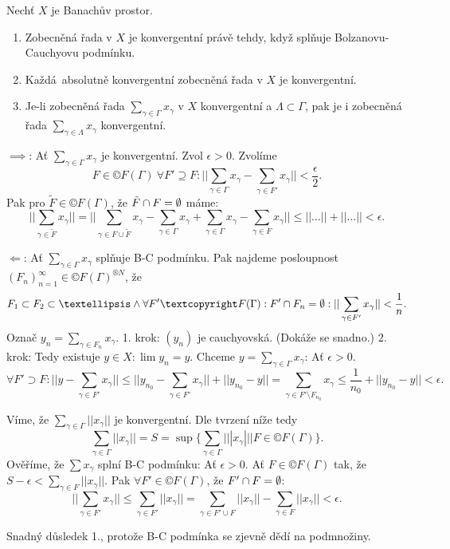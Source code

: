\documentclass[12pt]{article}					%
\begin{document}
\begin{veta}
	Nechť $X$ je Banachův prostor.
	
	\begin{enumerate}
		\item Zobecněná řada v $X$ je konvergentní právě tehdy, když splňuje Bolzanovu-Cauchyovu podmínku.
		\item Každá absolutně konvergentní zobecněná řada v $X$ je konvergentní.
		\item Je-li zobecněná řada $\sum_{\gamma \in \Gamma} x_\gamma$ v $X$ konvergentní a $\Lambda \subset \Gamma$, pak je i zobecněná řada $\sum_{\gamma \in \Lambda} x_\gamma$ konvergentní.
	\end{enumerate}

	\begin{dukazin}[1.]
		$\implies$: Ať $\sum_{\gamma \in \Gamma} x_\gamma$ je konvergentní. Zvol $\epsilon > 0$. Zvolíme 
		$$ F \in ©F(\Gamma)\ \forall F' \supseteq F: ||\sum_{\gamma \in \Gamma}x_\gamma - \sum_{\gamma \in F'}x_\gamma|| < \frac{\epsilon}{2}. $$
		Pak pro $\tilde{F} \in ©F(\Gamma)$, že $\tilde{F} \cap F = \emptyset$ máme:
		$$ ||\sum_{\gamma \in \tilde{F}} x_\gamma|| = ||\sum_{\gamma \in F \cup \tilde{F}} x_\gamma - \sum_{\gamma \in \Gamma} x_\gamma + \sum_{\gamma \in \Gamma} x_\gamma - \sum_{\gamma \in F} x_\gamma|| ≤ ||…|| + ||…|| < \epsilon. $$

		$\Leftarrow$: Ať $\sum_{\gamma \in \Gamma} x_\gamma$ splňuje B-C podmínku. Pak najdeme posloupnost $(F_n)_{n=1}^∞ \in ©F(\Gamma)^{®N}$, že
		$$ F_1 \subset F_2 \subset … \land \forall F' ©F(\Gamma): F' \cap F_n = \O: ||\sum_{\gamma \in F'} x_{\gamma}|| < \frac{1}{n}. $$
		Označ $y_n = \sum_{\gamma \in F_n} x_\gamma$.
		1. krok: $(y_n)$ je cauchyovská. (Dokáže se snadno.) 2. krok: Tedy existuje $y \in X: \lim y_n = y$. Chceme $y = \sum_{\gamma \in \Gamma} x_\gamma$: Ať $\epsilon > 0$. 
		$$ \forall F' \supset F: ||y  - \sum_{\gamma \in F'} x_\gamma|| ≤ ||y_{n_0} - \sum_{\gamma \in F'} x_\gamma|| + ||y_{n_0} - y|| = \sum_{\gamma \in F' \setminus F_{n_0}} x_\gamma ≤ \frac{1}{n_0} + ||y_{n_0} - y|| < \epsilon. $$
	\end{dukazin}

	\begin{dukazin}[2.]
		Víme, že $\sum_{\gamma \in \Gamma}||x_\gamma||$ je konvergentní. Dle tvrzení níže tedy
		$$ \sum_{\gamma \in \Gamma}||x_\gamma|| = S = \sup\{\sum_{\gamma \in \Gamma} | ||x_\gamma|| | F \in ©F(\Gamma)\}. $$
		Ověříme, že $\sum x_\gamma$ splní B-C podmínku: Ať $\epsilon > 0$. Ať $F \in ©F(\Gamma)$ tak, že $S - \epsilon < \sum_{\gamma \in F}||x_\gamma||$. Pak $\forall F' \in ©F(\Gamma)$, že $F' \cap F = \emptyset$:
		$$ ||\sum_{\gamma \in F'} x_\gamma || ≤ \sum_{\gamma \in F'} || x_\gamma || = \sum_{\gamma \in F' \cup F} ||x_\gamma|| - \sum_{\gamma \in F} ||x_\gamma|| < \epsilon. $$
	\end{dukazin}

	\begin{dukazin}[3.]
		Snadný důsledek 1., protože B-C podmínka se zjevně dědí na podmnožiny.
	\end{dukazin}
\end{veta}
\end{document}
